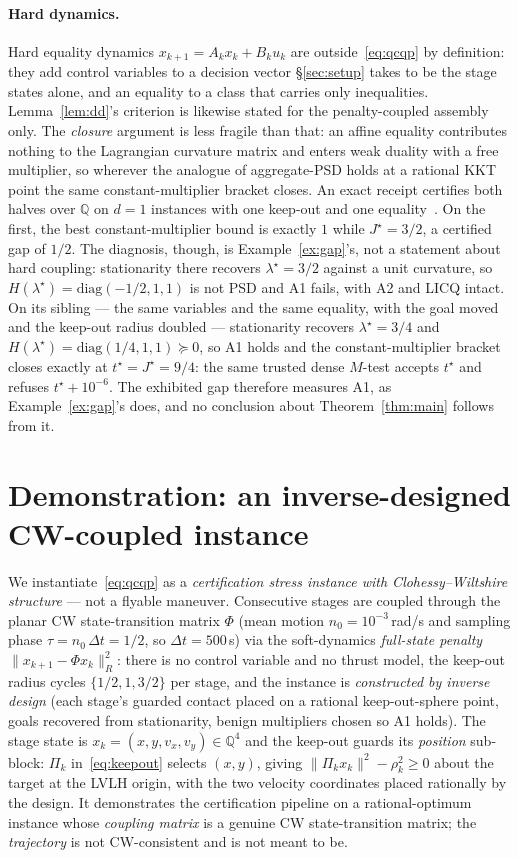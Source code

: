 \documentclass[11pt]{article}
\theoremstyle{definition}
\theoremstyle{remark}
\newcommand{\Q}{\mathbb{Q}}
\renewcommand{\_}{\ifdim\fontdimen3\font=0pt\relax\char`\_\else\textunderscore\fi\hspace{0pt}}
\begin{document}
\paragraph{Hard dynamics.} Hard equality dynamics $x_{k+1}=A_kx_k+B_ku_k$ are
outside~\eqref{eq:qcqp} by definition: they add control variables to a
decision vector \S\ref{sec:setup} takes to be the stage states alone, and an
equality to a class that carries only inequalities.
Lemma~\ref{lem:dd}'s criterion is likewise stated for the penalty-coupled
assembly only. The \emph{closure} argument is less fragile than that: an
affine equality contributes nothing to the Lagrangian curvature matrix and
enters weak duality with a free multiplier, so wherever the analogue of
aggregate-PSD holds at a rational KKT point the same constant-multiplier
bracket closes. An exact receipt certifies both halves over
$\Q$ on $d{=}1$ instances with one keep-out and one
equality~\cite{leannote}. On the first, the best constant-multiplier bound is
exactly $1$ while $J^\star=3/2$, a certified gap of $1/2$. The diagnosis,
though, is Example~\ref{ex:gap}'s, not a statement about hard coupling:
stationarity there recovers $\lambda^\star=3/2$ against a unit curvature, so
$H(\lambda^\star)=\mathrm{diag}(-1/2,1,1)$ is not PSD and A1 fails, with A2
and LICQ intact. On its sibling --- the same variables and the same equality,
with the goal moved and the keep-out radius doubled --- stationarity recovers
$\lambda^\star=3/4$ and $H(\lambda^\star)=\mathrm{diag}(1/4,1,1)\succeq0$, so
A1 holds and the constant-multiplier bracket closes exactly at
$t^\star=J^\star=9/4$: the same trusted dense $M$-test accepts $t^\star$ and
refuses $t^\star+10^{-6}$. The exhibited gap therefore measures A1, as
Example~\ref{ex:gap}'s does, and no conclusion about Theorem~\ref{thm:main}
follows from it.

\section{Demonstration: an inverse-designed CW-coupled instance}\label{sec:rpod}
We instantiate~\eqref{eq:qcqp} as a \emph{certification stress instance with
Clohessy--Wiltshire structure} --- not a flyable maneuver. Consecutive stages
are coupled through the planar CW state-transition matrix $\Phi$ (mean motion
$n_0=10^{-3}$\,rad/s and sampling phase $\tau=n_0\,\Delta t=1/2$, so
$\Delta t=500$\,s) via the soft-dynamics \emph{full-state penalty}
$\lVert x_{k+1}-\Phi x_k\rVert^2_R$:
there is no control variable and no thrust model, the keep-out radius cycles
$\{1/2,1,3/2\}$ per stage, and the instance is \emph{constructed by inverse
design} (each
stage's guarded contact placed on a rational keep-out-sphere point, goals
recovered from stationarity, benign multipliers chosen so A1 holds). The stage
state is $x_k=(x,y,v_x,v_y)\in\Q^4$ and the keep-out guards its \emph{position}
sub-block: $\Pi_k$ in~\eqref{eq:keepout} selects $(x,y)$, giving
$\lVert\Pi_kx_k\rVert^2-\rho_k^2\ge0$ about the target at the LVLH origin, with
the two velocity coordinates placed rationally by the design. It demonstrates
the certification pipeline on a rational-optimum instance whose \emph{coupling
matrix} is a genuine CW state-transition matrix; the \emph{trajectory} is not
CW-consistent and is not meant to be.
\end{document}
